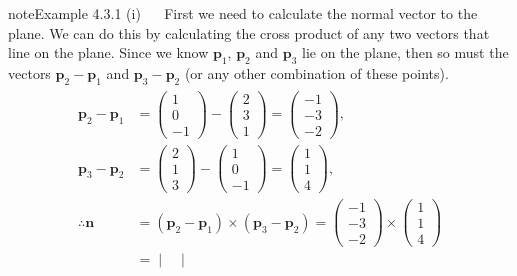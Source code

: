 \documentclass[letterpaper,10pt,english]{jupyterBook}
\begin{document}
\begin{sphinxadmonition}{note}{Example 4.3.1}
\sphinxAtStartPar
(i)   First we need to calculate the normal vector to the plane. We can do this by calculating the cross product of any two vectors that line on the plane. Since we know \(\mathbf{p}_1\), \(\mathbf{p}_2\) and \(\mathbf{p}_3\) lie on the plane, then so must the vectors \(\mathbf{p}_2 - \mathbf{p}_1\) and \(\mathbf{p}_3 - \mathbf{p}_2\) (or any other combination of these points).
\begin{equation*}
\begin{split} \begin{align*}
    \mathbf{p}_2 - \mathbf{p}_1 &=
    \begin{pmatrix} 1 \\ 0 \\ -1 \end{pmatrix} -
    \begin{pmatrix} 2 \\ 3 \\ 1 \end{pmatrix} =
    \begin{pmatrix} -1 \\ -3 \\ -2 \end{pmatrix}, \\
    \mathbf{p}_3 - \mathbf{p}_2 &=
    \begin{pmatrix} 2 \\ 1 \\ 3 \end{pmatrix} -
    \begin{pmatrix} 1 \\ 0 \\ -1 \end{pmatrix} =
    \begin{pmatrix} 1 \\ 1 \\ 4 \end{pmatrix}, \\
    \therefore \mathbf{n} &= (\mathbf{p}_2 - \mathbf{p}_1) \times (\mathbf{p}_3 - \mathbf{p}_2) =
    \begin{pmatrix} -1 \\ -3 \\ -2 \end{pmatrix} \times
    \begin{pmatrix} 1 \\ 1 \\ 4 \end{pmatrix} \\
    &=
    \begin{vmatrix}

\end{vmatrix}
\end{align*}
\end{split}
\end{equation*}
\end{sphinxadmonition}
\end{document}
